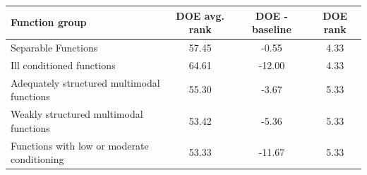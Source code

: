 \begin{tabular}{lccc}
\toprule
Function group & DOE avg. rank & DOE - baseline & DOE rank \\
\midrule
Separable Functions & 57.45 & -0.55 & 4.33 \\
Ill conditioned functions & 64.61 & -12.00 & 4.33 \\
Adequately structured multimodal functions & 55.30 & -3.67 & 5.33 \\
Weakly structured multimodal functions & 53.42 & -5.36 & 5.33 \\
Functions with low or moderate conditioning & 53.33 & -11.67 & 5.33 \\
\bottomrule
\end{tabular}

